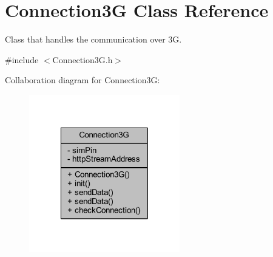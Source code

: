 \hypertarget{class_connection3_g}{}\section{Connection3G Class Reference}
\label{class_connection3_g}


Class that handles the communication over 3G.  




{\ttfamily \#include $<$Connection3\+G.\+h$>$}



Collaboration diagram for Connection3G\+:\nopagebreak
\begin{figure}[H]
\begin{center}
\leavevmode
\includegraphics[width=186pt]{class_connection3_g__coll__graph}
\end{center}
\end{figure}
